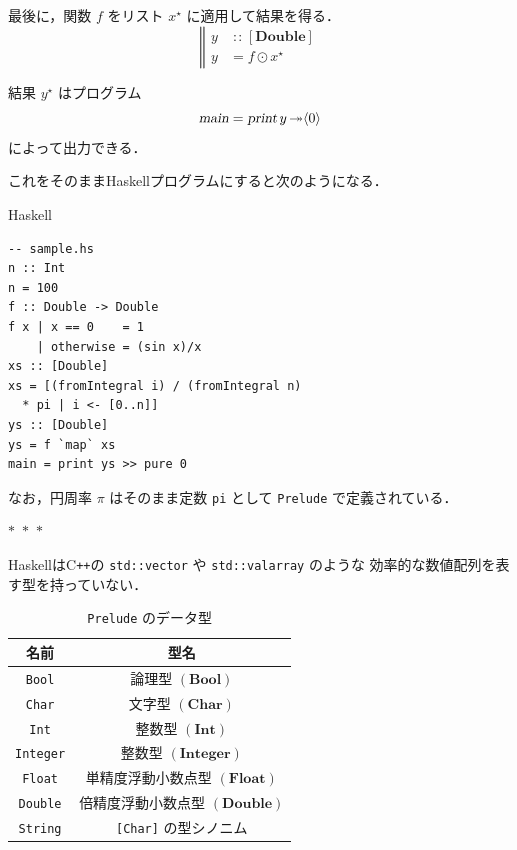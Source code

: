 \documentclass[a5paper,twoside,fleqn]{jsbook}
\newcommand{\separator}{\begin{center}$*$~$*$~$*$\end{center}}
\newcommand{\programminglanguage}[1]{\textsf{#1}}
\newcommand{\cxx}{\programminglanguage{C}\texttt{++}}
\newcommand{\haskell}{\programminglanguage{Haskell}}
\newcommand{\code}[1]{\texttt{#1}}
\newcommand{\filename}[1]{\texttt{#1}}
\newenvironment{haskellcode}{\begin{itembox}[r]{\haskell}}{\end{itembox}}
\newcommand{\mBrace}{\Vert}
\newcommand{\mAction}[1]{\textsl{#1}}
\DeclareMathOperator{\mMain}{\mAction{main}}
\DeclareMathOperator{\mPrint}{\mAction{print}}
\DeclareMathOperator{\mBindRightIgnore}{\twoheadrightarrow}
\DeclareMathOperator{\mIn}{{:\!:}}
\DeclareMathOperator{\mMapList}{\odot}
\newcommand{\mType}[1]{\mathbf{#1}}
\newcommand{\mBoolType}{\mType{Bool}}
\newcommand{\mCharType}{\mType{Char}}
\newcommand{\mFloatType}{\mType{Float}}
\newcommand{\mDoubleType}{\mType{Double}}
\newcommand{\mIntType}{\mType{Int}}
\newcommand{\mIntegerType}{\mType{Integer}}
\newcommand{\mListType}[1]{[\mType{#1}]}
\newcommand{\mPureWith}[1]{\langle#1\rangle}
\newcommand{\mList}[1]{{#1}^\mathrm{\star}}
\begin{document}
最後に，関数 $f$ をリスト $\mList{x}$ に適用して結果を得る．
\begin{equation}
\left\mBrace
\begin{aligned}
y&\mIn{}\mListType{\mDoubleType}\\
y&=f\mMapList\mList{x}
\end{aligned}
\right.
\end{equation}

結果 $\mList{y}$ はプログラム
\begin{equation}
\mMain=\mPrint y\mBindRightIgnore\mPureWith{0}
\end{equation}
によって出力できる．

これをそのまま\haskell プログラムにすると次のようになる．
\begin{haskellcode}
\begin{verbatim}
-- sample.hs
n :: Int
n = 100
f :: Double -> Double
f x | x == 0    = 1
    | otherwise = (sin x)/x
xs :: [Double]
xs = [(fromIntegral i) / (fromIntegral n)
  * pi | i <- [0..n]]
ys :: [Double]
ys = f `map` xs
main = print ys >> pure 0
\end{verbatim}
\end{haskellcode}

なお，円周率 $\pi$ はそのまま定数 \code{pi} として \filename{Prelude}
で定義されている．

\separator

\haskell は\cxx の \code{std::vector} や \code{std::valarray} のような
効率的な数値配列を表す型を持っていない．

\begin{table}
\caption{\filename{Prelude} のデータ型}
\label{tab:data-types}
\begin{center}
\begin{tabular}{||c|c||}
\hline
名前&型名\\
\hline\hline
\code{Bool}&論理型 $(\mBoolType)$\\
\code{Char}&文字型 $(\mCharType)$\\
\code{Int}&整数型 $(\mIntType)$\\
\code{Integer}&整数型 $(\mIntegerType)$\\
\code{Float}&単精度浮動小数点型 $(\mFloatType)$\\
\code{Double}&倍精度浮動小数点型 $(\mDoubleType)$\\
\code{String}&\code{[Char]} の型シノニム\\
\hline
\end{tabular}
\end{center}
\end{table}
\end{document}
